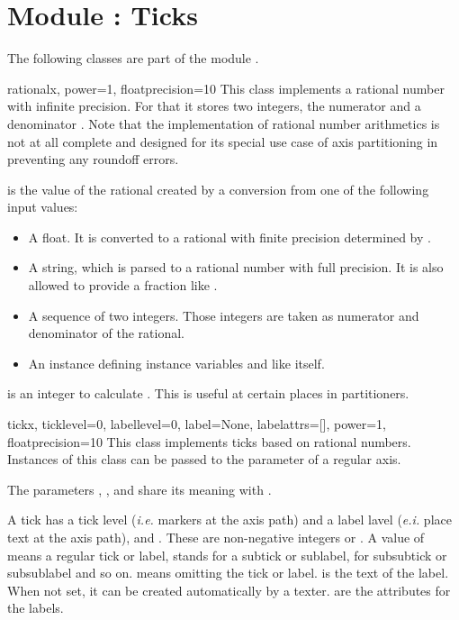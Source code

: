 \section{Module : Ticks} %


The following classes are part of the module .

\begin{classdesc}{rational}{x, power=1, floatprecision=10}
  This class implements a rational number with infinite precision. For
  that it stores two integers, the numerator  and a
  denominator . Note that the implementation of rational
  number arithmetics is not at all complete and designed for its
  special use case of axis partitioning in \PyX{} preventing any
  roundoff errors.

   is the value of the rational created by a conversion from
  one of the following input values:
  \begin{itemize}
  \item A float. It is converted to a rational with finite precision
    determined by .
  \item A string, which is parsed to a rational number with full
    precision. It is also allowed to provide a fraction like
    .
  \item A sequence of two integers. Those integers are taken as
    numerator and denominator of the rational.
  \item An instance defining instance variables  and
   like  itself.
  \end{itemize}

   is an integer to calculate .
  This is useful at certain places in partitioners.
\end{classdesc}

\begin{classdesc}{tick}{x, ticklevel=0, labellevel=0, label=None,
                        labelattrs=[], power=1, floatprecision=10}
  This class implements ticks based on rational numbers. Instances of
  this class can be passed to the  parameter of a
  regular axis.

  The parameters , , and  share
  its meaning with .

  A tick has a tick level (\emph{i.e.} markers at the axis path) and a
  label lavel (\emph{e.i.} place text at the axis path),
   and . These are non-negative
  integers or . A value of  means a regular tick or
  label,  stands for a subtick or sublabel,  for
  subsubtick or subsublabel and so on.  means omitting the
  tick or label.  is the text of the label. When not set,
  it can be created automatically by a texter.  are
  the attributes for the labels.
\end{classdesc} %

